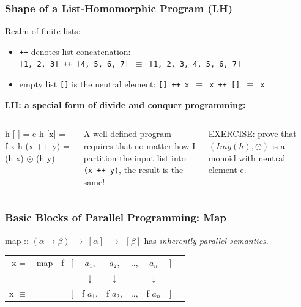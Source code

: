\documentclass{beamer}
\renewcommand{\emph}[1]{\textcolor{structure}{#1}}
\newcommand{\emp}[1]{\textcolor{DikuRed}{ #1}}
\newcommand{\mymath}[1]{$ #1 $}
\begin{document}
\begin{frame}[fragile,t]
\frametitle{Shape of a List-Homomorphic Program (LH)}

Realm of finite lists:
\begin{itemize}
    \item {\tt ++} denotes list concatenation:\\
    {\tt [1, 2, 3] ++ [4, 5, 6, 7] $\equiv$ [1, 2, 3, 4, 5, 6, 7]}
    \item empty list {\tt []} is the neutral element:
        {\tt [] ++ x $\equiv$ x ++ [] $\equiv$ x}
\end{itemize}
\bigskip

\emp{\bf LH: a special form of divide and conquer programming:}
\begin{columns}
\begin{colorcode}[fontsize=\small]
h [ ]   = e
h [x]   = f x
h (x ++ y) = (h x) \mymath{\odot} (h y)
\end{colorcode}
\emph{A well-defined program requires that no matter how 
I partition the input list into\\ {\tt (x ++ y)}, the result is the same!}
\begin{colorcode}[fontsize=\small]
\alert{EXERCISE:} prove that
\mymath{(Img(h),\odot)} is a monoid 
with neutral element e.
\end{colorcode}
\end{columns}

\end{frame}


\begin{frame}[fragile,t]
   \frametitle{Basic Blocks of Parallel Programming: Map}

\bigskip

\emp{map} :: $(\alpha \to \beta) ~\to~ [\alpha] ~~\to~~ [\beta] $ has \emph{\em inherently parallel semantics}.


\bigskip

\begin{tabular}{crcccccl}
x = & \emp{map}~~f~ [& $a_1$, & $a_2$, & .., & $a_n$ & ]\\
    &      & $\downarrow$ & $\downarrow$ &  & $\downarrow$ & &\\
x $\equiv$ &  [  & \emph{f $a_1$}, & \emph{f $a_2$}, & .., & \emph{f $a_n$} & ] &
\end{tabular}

\end{frame}
\end{document}
